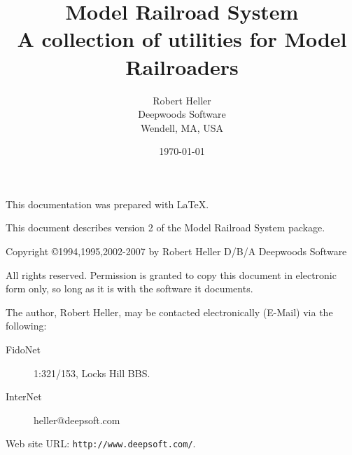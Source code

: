 \title{Model Railroad System \\ A collection of utilities for Model Railroaders\\ \MRRSubTitle}
\author{Robert Heller \\ Deepwoods Software \\ Wendell, MA, USA}
\date{\today}
\begin{titlepage}

\maketitle


\clearpage


This documentation was prepared with \LaTeX.

This document describes version 2 of the Model Railroad System package.

\vspace{.25in}



{\small Copyright \copyright 1994,1995,2002-2007 by Robert Heller D/B/A Deepwoods
Software}

\vspace{.25in}

All rights reserved.  Permission is granted to copy this document in
electronic form only, so long as it is with the software it
documents. 

The author, Robert Heller, may be contacted electronically (E-Mail) via
the following:

\begin{description}
\item[FidoNet] 1:321/153, Locks Hill BBS.
\item[InterNet] heller@deepsoft.com
\end{description}

Web site URL: {\tt http://www.deepsoft.com/}.

\thispagestyle{empty}
\setcounter{page}{0}
\clearpage

\end{titlepage}

